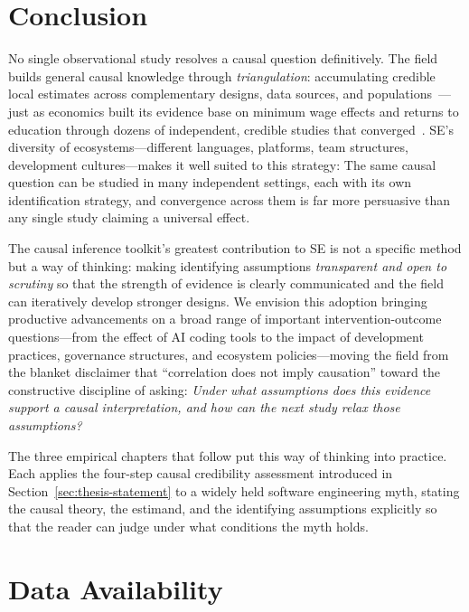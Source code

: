 \section{Conclusion}

No single observational study resolves a causal question definitively.
The field builds general causal knowledge through \emph{triangulation}: accumulating credible local estimates across complementary designs, data sources, and populations~\cite{shadish2002experimental}---just as economics built its evidence base on minimum wage effects and returns to education through dozens of independent, credible studies that converged~\cite{angrist2010credibility}.
SE's diversity of ecosystems---different languages, platforms, team structures, development cultures---makes it well suited to this strategy: The same causal question can be studied in many independent settings, each with its own identification strategy, and convergence across them is far more persuasive than any single study claiming a universal effect.

The causal inference toolkit's greatest contribution to SE is not a specific method but a way of thinking: making identifying assumptions \emph{transparent and open to scrutiny} so that the strength of evidence is clearly communicated and the field can iteratively develop stronger designs.
We envision this adoption bringing productive advancements on a broad range of important intervention-outcome questions---from the effect of AI coding tools to the impact of development practices, governance structures, and ecosystem policies---moving the field from the blanket disclaimer that ``correlation does not imply causation'' toward the constructive discipline of asking: \emph{Under what assumptions does this evidence support a causal interpretation, and how can the next study relax those assumptions?}

The three empirical chapters that follow put this way of thinking into practice.
Each applies the four-step causal credibility assessment introduced in Section~\ref{sec:thesis-statement} to a widely held software engineering myth, stating the causal theory, the estimand, and the identifying assumptions explicitly so that the reader can judge under what conditions the myth holds.

\section{Data Availability}
\label{sec:tutorial-data-availability}

